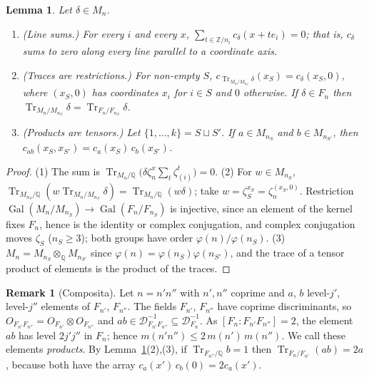 \documentclass[11pt]{amsart}
\newcommand{\Q}{\mathbb{Q}}
\newcommand{\Z}{\mathbb{Z}}
\newcommand{\cod}[1]{\mathcal{D}_{#1}^{-1}}
\DeclareMathOperator{\Tr}{Tr}
\DeclareMathOperator{\Gal}{Gal}
\theoremstyle{plain}
\newtheorem{lemma}[theorem]{Lemma}
\theoremstyle{definition}
\newtheorem{remark}[theorem]{Remark}
\begin{document}
\begin{lemma}\label{lem:blocks}
Let $\delta \in M_n$.
\begin{enumerate}
\item \textup{(Line sums.)} For every $i$ and every $x$,
  $\sum_{t \in \Z/n_i} c_\delta(x + t e_i) = 0$; that is, $c_\delta$ sums to zero along every line
  parallel to a coordinate axis.
\item \textup{(Traces are restrictions.)} For non-empty $S$,
  $c_{\Tr_{M_n/M_{n_S}}\delta}(x_S) = c_\delta(x_S, 0)$, where $(x_S, 0)$ has coordinates $x_i$
  for $i \in S$ and $0$ otherwise. If $\delta \in F_n$ then
  $\Tr_{M_n/M_{n_S}}\delta = \Tr_{F_n/F_{n_S}}\delta$.
\item \textup{(Products are tensors.)} Let $\{1, \dots, k\} = S \sqcup S'$. If
  $a \in M_{n_S}$ and $b \in M_{n_{S'}}$, then $c_{ab}(x_S, x_{S'}) = c_a(x_S)\,c_b(x_{S'})$.
\end{enumerate}
\end{lemma}

\begin{proof}
(1) The sum is $\Tr_{M_n/\Q}\bigl(\delta\zeta_n^x\sum_t\zeta_{(i)}^t\bigr) = 0$.
(2) For $w \in M_{n_S}$, $\Tr_{M_{n_S}/\Q}(w\Tr_{M_n/M_{n_S}}\delta) = \Tr_{M_n/\Q}(w\delta)$; take
$w = \zeta_S^{x_S} = \zeta_n^{(x_S,0)}$. Restriction $\Gal(M_n/M_{n_S}) \to \Gal(F_n/F_{n_S})$ is
injective, since an element of the kernel fixes $F_n$, hence is the identity or complex
conjugation, and complex conjugation moves $\zeta_S$ ($n_S \geq 3$); both groups have order
$\varphi(n)/\varphi(n_S)$.
(3) $M_n = M_{n_S} \otimes_\Q M_{n_{S'}}$ since $\varphi(n) = \varphi(n_S)\varphi(n_{S'})$, and the
trace of a tensor product of elements is the product of the traces.
\end{proof}

\begin{remark}[Composita]\label{rem:compositum}
Let $n = n'n''$ with $n', n''$ coprime and $a$, $b$ level-$j'$, level-$j''$ elements of
$F_{n'}$, $F_{n''}$. The fields $F_{n'}$, $F_{n''}$ have coprime discriminants, so
$O_{F_{n'}F_{n''}} = O_{F_{n'}} \otimes O_{F_{n''}}$ and $ab \in \cod{F_{n'}F_{n''}} \subseteq
\cod{F_n}$. As $[F_n : F_{n'}F_{n''}] = 2$, the element $ab$ has level $2j'j''$ in $F_n$; hence
$m(n'n'') \leq 2\,m(n')\,m(n'')$. We call these elements \emph{products}. By
Lemma~\ref{lem:blocks}(2),(3), if $\Tr_{F_{n''}/\Q} b = 1$ then
$\Tr_{F_n/F_{n'}}(ab) = 2a$, because both have the array $c_a(x')\,c_b(0) = 2c_a(x')$.
\end{remark}
\end{document}
